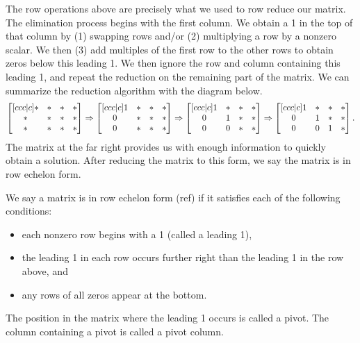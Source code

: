 The row operations above are precisely what we used to row reduce our matrix. The elimination process begins with the first column. We obtain a 1 in the top of that column by (1) swapping rows and/or  (2) multiplying a row by a nonzero scalar. We then (3) add multiples of the first row to the other rows to obtain zeros below this leading 1.  We then ignore the row and column containing this leading 1, and repeat the reduction on the remaining part of the matrix. We can summarize the reduction algorithm with the diagram below.
$$
\begin{bmatrix} [ccc|c]
* & * & * & * \\
* & * & * & * \\
* & * & * & * \\
 \end{bmatrix}
\Rightarrow
\begin{bmatrix} [ccc|c]
1 & * & * & * \\
0 & * & * & * \\
0 & * & * & * \\
 \end{bmatrix}
\Rightarrow
\begin{bmatrix} [ccc|c]
1 & * & * & * \\
0 & 1 & * & * \\
0 & 0 & * & * \\
 \end{bmatrix}
\Rightarrow
\begin{bmatrix} [ccc|c]
1 & * & * & * \\
0 & 1 & * & * \\
0 & 0 & 1 & * \\
 \end{bmatrix}.
$$
The matrix at the far right provides us with enough information to quickly obtain a solution. After reducing the matrix to this form, we say the matrix is in row echelon form. 

\begin{definition}
We say a matrix is in row echelon form (ref) if it satisfies each of the following conditions:
\begin{itemize}
  \item each nonzero row begins with a 1 (called a leading 1),
  \item the leading 1 in each row occurs further right than the leading 1 in the row above, and
  \item any rows of all zeros appear at the bottom.
\end{itemize}
The position in the matrix where the leading 1 occurs is called a pivot.
The column containing a pivot is called a pivot column.
\end{definition}





